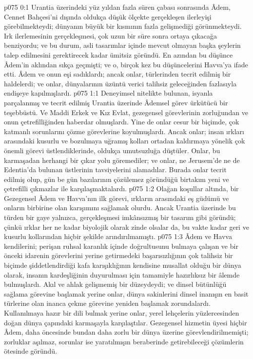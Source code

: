 \vs p075 0:1 Urantia üzerindeki yüz yıldan fazla süren çabası sonrasında Âdem, Cennet Bahçesi’ni dışında oldukça düşük ölçekte gerçekleşen ilerleyişi görebilmekteydi; dünyanın büyük bir kısmının fazla gelişmediği görünmekteydi. Irk ilerlemesinin gerçekleşmesi, çok uzun bir süre sonra ortaya çıkacağa benziyordu; ve bu durum, asli tasarımlar içinde mevcut olmayan başka şeylerin talep edilmesini gerektirecek kadar ümitsiz göründü. En azından bu düşünce Âdem’in aklından sıkça geçmişti; ve o, birçok kez bu düşüncelerini Havva’ya ifade etti. Âdem ve onun eşi sadıklardı; ancak onlar, türlerinden tecrit edilmiş bir haldelerdi; ve onlar, dünyalarının üzüntü verici talihsiz geleceğinden fazlasıyla endişeye kapılmışlardı.
\vs p075 1:1 Deneyimsel nitelikte bulunan, isyanla parçalanmış ve tecrit edilmiş Urantia üzerinde Âdemsel görev ürkütücü bir teşebbüstü. Ve Maddi Erkek ve Kız Evlat, gezegensel görevlerinin zorluğundan ve onun çetrefilliğinden haberdar olmuşlardı. Yine de onlar cesur bir biçimde, çok katmanlı sorunlarını çözme görevlerine koyulmuşlardı. Ancak onlar; insan ırkları arasındaki kusurlu ve bozulmaya uğramış kolları ortadan kaldırmaya yönelik çok önemli görevi üstlendiklerinde, oldukça umutsuzluğa düştüler. Onlar, bu karmaşadan herhangi bir çıkar yolu göremediler; ve onlar, ne Jerusem’de ne de Edentia’da bulunan üstlerinin tavsiyelerini alamadılar. Burada onlar tecrit edilmiş olup, gün be gün bazılarının çözülemez göründüğü birtakım yeni ve çetrefilli çıkmazlar ile karşılaşmaktalardı.
\vs p075 1:2 Olağan koşullar altında, bir Gezegensel Âdem ve Havva’nın ilk görevi, ırkların arasındaki eş güdümü ve onların birbirine olan karışımını sağlamak olurdu. Ancak Urantia üzerinde bu türden bir gaye yalnızca, gerçekleşmesi imkânsızmış bir tasarım gibi göründü; çünkü ırklar her ne kadar biyolojik olarak zinde olsalar da, bu vakte kadar geri ve kusurlu kollarından hiçbir şekilde arındırılmamıştı.
\vs p075 1:3 Âdem ve Havva kendilerini; perişan ruhsal karanlık içinde doğrultusunu bulmaya çalışan ve bir önceki idarenin görevlerini yerine getirmedeki başarısızlığının çok talihsiz bir biçimde şiddetlendirdiği kafa karışıklığının kendisine musallat olduğu bir dünya olarak, insanın kardeşliğinin duyurulması için tamamiyle hazırlıksız bir âlemde bulmuşlardı. Akıl ve ahlak gelişmemiş bir düzeydeydi; ve dinsel bütünlüğü sağlama görevine başlamak yerine onlar, dünya sakinlerini dinsel inanışın en basit türlerine olan inanca çekme görevine yeniden başlamak zorundalardı. Kullanılmaya hazır bir dili bulmak yerine onlar, yerel lehçelerin yüzlercesinden doğan dünya çapındaki karmaşayla karşılaştılar. Gezegensel hizmetin üyesi hiçbir Âdem, daha öncesinde bundan daha zorlu bir dünya üzerine görevlendirilmemişti; zorluklar aşılmaz, sorunlar ise yaratılmışın beraberinde getirebileceği çözümlerin ötesinde göründü.

